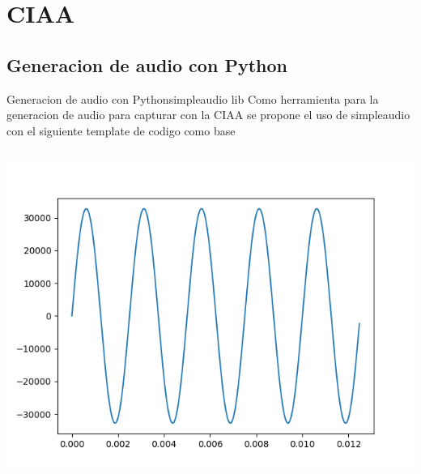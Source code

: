  \section{CIAA}
 \subsection{Generacion de audio con Python}
 \begin{frame}{Generacion de audio con Python}{simpleaudio lib}
    \handsonicon
    Como herramienta para la generacion de audio para capturar con la CIAA se propone el uso de simpleaudio con el siguiente template de codigo como base
    \begin{columns}[onlytextwidth]
       
       \includegraphics[width=\textwidth]{1_clase/audio_gen1.png}
    \end{columns}
    \vfill
 \end{frame}
